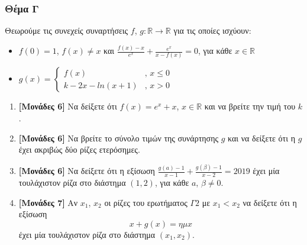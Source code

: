 \documentclass[12pt, a4paper]{article}
\begin{document}
  \section*{Θέμα Γ}
    \noindent
    Θεωρούμε τις συνεχείς συναρτήσεις $f$, $g:\mathbb{R}\to \mathbb{R}$ για τις οποίες ισχύουν:
    \begin{itemize}
      \item $f(0)=1$, $f(x)\ne x$ και $\frac{f(x)-x}{e^x}+\frac{e^x}{x-f(x)}=0$, για κάθε $x\in \mathbb{R}$
      \item $g(x)=\begin{cases} f(x) & \text{, }  x\le 0 \\ k-2x-ln(x+1) & \text{, }  x>0\end{cases}$
    \end{itemize}

    \begin{enumerate}
      \item \textbf{[Μονάδες 6]} Να δείξετε ότι $f(x)=e^x+x$, $x\in \mathbb{R}$ και να βρείτε την τιμή του $k$.
      \item \textbf{[Μονάδες 6]} Να βρείτε το σύνολο τιμών της συνάρτησης $g$ και να δείξετε ότι η $g$ έχει ακριβώς δύο ρίζες ετερόσημες.
      \item \textbf{[Μονάδες 6]} Να δείξετε ότι η εξίσωση $\frac{g(a)-1}{x-1}+\frac{g(β)-1}{x-2}=2019$ έχει μία τουλάχιστον ρίζα στο διάστημα $(1,2)$, για κάθε $a$, $β\ne 0$.
      \item \textbf{[Μονάδες 7]} Αν $x_1$, $x_2$ οι ρίζες του ερωτήματος $Γ2$ με $x_1 < x_2$ να δείξετε ότι η εξίσωση
      $$x+g(x)=ημ x$$
      έχει μία τουλάχιστον ρίζα στο διάστημα $(x_1,x_2)$.
    \end{enumerate}

\vspace{3\baselineskip}

\part*{}
\end{document}

